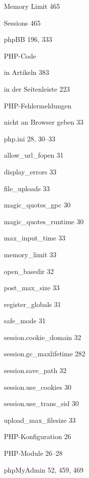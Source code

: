 \documentclass{book}
\renewcommand\subitem{\par}
\begin{document}
\begin{multicols}{2}
\begin{osp-index}
    \subitem Memory Limit\hspace{1mm} 465
    \subitem Sessions\hspace{1mm} 465
  \item phpBB\hspace{1mm} 196, 333
  \item PHP-Code
    \subitem in Artikeln\hspace{1mm} 383
    \subitem in der Seitenleiste\hspace{1mm} 223
  \item PHP-Fehlermeldungen
    \subitem nicht an Browser geben\hspace{1mm} 33
  \item php.ini\hspace{1mm} 28, 30--33
    \subitem allow\_url\_fopen\hspace{1mm} 31
    \subitem display\_errors\hspace{1mm} 33
    \subitem file\_uploads\hspace{1mm} 33
    \subitem magic\_quotes\_gpc\hspace{1mm} 30
    \subitem magic\_quotes\_runtime\hspace{1mm} 30
    \subitem max\_input\_time\hspace{1mm} 33
    \subitem memory\_limit\hspace{1mm} 33
    \subitem open\_basedir\hspace{1mm} 32
    \subitem post\_max\_size\hspace{1mm} 33
    \subitem register\_globals\hspace{1mm} 31
    \subitem safe\_mode\hspace{1mm} 31
    \subitem session.cookie\_domain\hspace{1mm} 32
    \subitem session.gc\_maxlifetime\hspace{1mm} 282
    \subitem session.save\_path\hspace{1mm} 32
    \subitem session.use\_cookies\hspace{1mm} 30
    \subitem session.use\_trans\_sid\hspace{1mm} 30
    \subitem upload\_max\_filesize\hspace{1mm} 33
  \item PHP-Konfiguration\hspace{1mm} 26
  \item PHP-Module\hspace{1mm} 26--28
  \item phpMyAdmin\hspace{1mm} 52, 459, 469

\end{osp-index}
\end{multicols}
\end{document}
